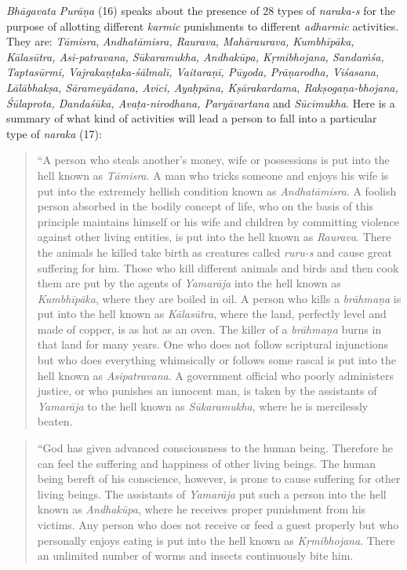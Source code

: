 \emph{Bhāgavata} \emph{Purāṇa} (16) speaks about the presence of 28 types of \emph{naraka-s} for the purpose of allotting different \emph{karmic} punishments to different \emph{adharmic} activities. They are: \emph{Tāmisra}, \emph{Andhatāmisra, Raurava, Mahāraurava, Kumbhīpāka, Kālasūtra, Asi-patravana, Sūkaramukha, Andhakūpa, Kṛmibhojana, Sandaṁśa, Taptasūrmi, Vajrakaṇṭaka-śālmalī, Vaitaraṇī, Pūyoda, Prāṇarodha, Viśasana, Lālābhakṣa, Sārameyādana, Avīci, Ayaḥpāna, Kṣārakardama, Rakṣogaṇa-bhojana, Śūlaprota, Dandaśūka, Avaṭa-nirodhana, Paryāvartana} and \emph{Sūcīmukha}. Here is a summary of what kind of activities will lead a person to fall into a particular type of \emph{naraka} (17):

\begin{quote}
``A person who steals another's money, wife or possessions is put into the hell known as \emph{Tāmisra}. A man who tricks someone and enjoys his wife is put into the extremely hellish condition known as \emph{Andhatāmisra}. A foolish person absorbed in the bodily concept of life, who on the basis of this principle maintains himself or his wife and children by committing violence against other living entities, is put into the hell known as \emph{Raurava}. There the animals he killed take birth as creatures called \emph{ruru-s} and cause great suffering for him. Those who kill different animals and birds and then cook them are put by the agents of \emph{Yamarāja} into the hell known as \emph{Kumbhīpāka}, where they are boiled in oil. A person who kills a \emph{brāhmaṇa} is put into the hell known as \emph{Kālasūtra}, where the land, perfectly level and made of copper, is as hot as an oven. The killer of a \emph{brāhmaṇa} burns in that land for many years. One who does not follow scriptural injunctions but who does everything whimsically or follows some rascal is put into the hell known as \emph{Asipatravana}. A government official who poorly administers justice, or who punishes an innocent man, is taken by the assistants of \emph{Yamarāja} to the hell known as \emph{Sūkaramukha}, where he is mercilessly beaten.
\end{quote}

\begin{quote}
``God has given advanced consciousness to the human being. Therefore he can feel the suffering and happiness of other living beings. The human being bereft of his conscience, however, is prone to cause suffering for other living beings. The assistants of \emph{Yamarāja} put such a person into the hell known as \emph{Andhakūpa}, where he receives proper punishment from his victims. Any person who does not receive or feed a guest properly but who personally enjoys eating is put into the hell known as \emph{Kṛmibhojana}. There an unlimited number of worms and insects continuously bite him.
\end{quote}

